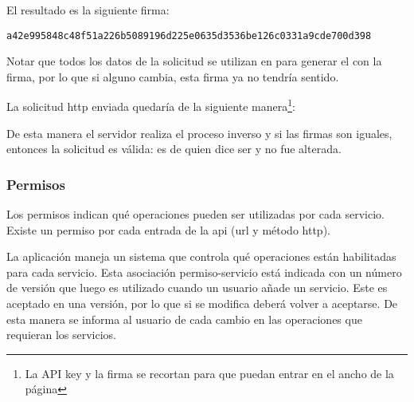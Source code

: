 \begingroup
\endgroup

El resultado es la siguiente firma:

\lstinline{a42e995848c48f51a226b5089196d225e0635d3536be126c0331a9cde700d398}


Notar que todos los datos de la solicitud se utilizan en para generar el  con la firma, por lo que si alguno cambia, esta firma ya no tendría sentido.

La solicitud \gls{http} enviada quedaría de la siguiente manera\footnote{La API key y la firma se recortan para que puedan entrar en el ancho de la página}:
\begingroup
\endgroup

De esta manera el servidor realiza el proceso inverso y si las firmas son iguales, entonces la solicitud es válida: es de quien dice ser y no fue alterada.

\subsubsection{Permisos}
\label{autenticacion_permisos}

Los permisos indican qué operaciones pueden ser utilizadas por cada servicio. Existe un permiso por cada entrada de la \gls{api} (\gls{url} y método \gls{http}).

La aplicación \nombreApp{} maneja un sistema que controla qué operaciones están habilitadas para cada servicio. Esta asociación permiso-servicio está indicada con un número de versión que luego es utilizado cuando un usuario añade un servicio. Este es aceptado en una versión, por lo que si se modifica deberá volver a aceptarse. De esta manera se informa al usuario de cada cambio en las operaciones que requieran los servicios.